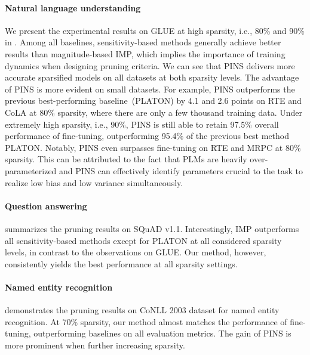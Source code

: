 \paragraph{Natural language understanding} We present the experimental results on GLUE at high sparsity, i.e., 80\% and 90\% in  . Among all baselines, sensitivity-based methods generally achieve better results than magnitude-based IMP, which implies the importance of training dynamics when designing pruning criteria. We can see that PINS delivers more accurate sparsified models on all datasets at both sparsity levels. The advantage of PINS is more evident on small datasets. For example, PINS outperforms the previous best-performing baseline~(PLATON) by 4.1 and 2.6 points on RTE and CoLA at 80\% sparsity, where there are only a few thousand training data. Under extremely high sparsity, i.e., 90\%, PINS is still able to retain 97.5\% overall performance of fine-tuning, outperforming 95.4\% of the previous best method PLATON. Notably, PINS even surpasses fine-tuning on RTE and MRPC at 80\% sparsity. This can be attributed to the fact that PLMs are heavily over-parameterized and PINS can effectively identify parameters crucial to the task to realize low bias and low variance simultaneously.


\paragraph{Question answering}  summarizes the pruning results on SQuAD v1.1. Interestingly, IMP outperforms all sensitivity-based methods except for PLATON at all considered sparsity levels, 
in contrast to the observations on GLUE. Our method, however,  consistently yields the best performance at all sparsity settings.
\paragraph{Named entity recognition}  demonstrates the pruning results on CoNLL 2003 dataset for named entity recognition. At 70\% sparsity, our method almost matches the performance of fine-tuning, outperforming baselines on all evaluation metrics. The gain of PINS is more prominent when further increasing sparsity.

